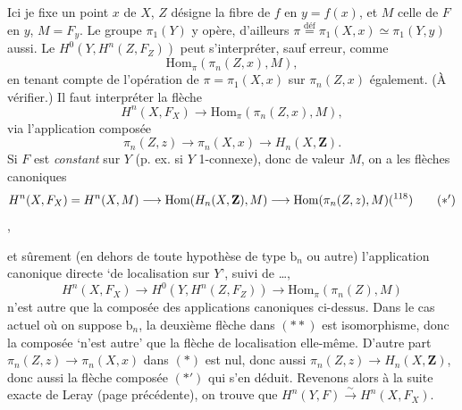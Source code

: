 \documentclass[11pt]{article}
\newcommand{\msp}[1]{\marginpar{\footnotesize [#1]}}
\begin{document}
Ici je fixe un point $x$ de $X$, $Z$ désigne la fibre de $f$ en $y=f(x)$, et $M$ celle de $F$ en $y$, $M=F_y$. Le groupe $\pi_1(Y)$ y opère, d’ailleurs $\pi \overset{\text{déf}}{=} \pi_1(X,x) \simeq \pi_1(Y,y)$ aussi. Le $H^0(Y,H^n(Z,F_Z))$ peut s’interpréter, sauf erreur, comme
\[
\mathrm{Hom}_\pi(\pi_n(Z,x),M),
\]
en tenant compte de l’opération de $\pi=\pi_1(X,x)$ sur $\pi_n(Z,x)$ également. (À vérifier.) Il faut interpréter la flèche
\[
H^n(X,F_X) \longrightarrow \mathrm{Hom}_\pi(\pi_n(Z,x),M),
\]
via l’application composée
\[
\pi_n(Z,z) \longrightarrow \pi_n(X,x) \longrightarrow H_n(X,\mathbf{Z}). \tag*{$(*)$}
\]
Si $F$ est \textit{constant} sur $Y$ (p. ex. si $Y$ 1-connexe), donc de valeur $M$, on a les flèches canoniques
\[
H^n(X,F_X) = H^n(X,M) \longrightarrow \mathrm{Hom}(H_n(X,\mathbf{Z}),M) \longrightarrow \mathrm{Hom}(\pi_n(Z,z),M)\text{(\footnotemark[118])} \tag*{$(*')$}
\]
,

\msp{page 182}
et sûrement (en dehors de toute hypothèse de type $\mathrm{b}_n$ ou autre) l’application canonique directe ‘de localisation sur $Y$’, suivi de \dots,
\[
H^n(X,F_X) \longrightarrow H^0(Y,H^n(Z,F_Z)) \longrightarrow \mathrm{Hom}_\pi(\pi_n(Z),M) \tag*{$(**)$}
\]
n’est autre que la composée des applications canoniques ci-dessus. Dans le cas actuel où on suppose $\mathrm{b}_n$, la deuxième flèche dans $(**)$ est isomorphisme, donc la composée ‘n’est autre’ que la flèche de localisation elle-même. D’autre part $\pi_n(Z,z) \longrightarrow \pi_n(X,x)$ dans $(*)$ est nul, donc aussi $\pi_n(Z,z) \longrightarrow H_n(X,\mathbf{Z})$, donc aussi la flèche composée $(*')$ qui s’en déduit. Revenons alors à la suite exacte de Leray (page précédente), on trouve que $H^n(Y,F) \xrightarrow{\ \sim\ } H^n(X,F_X)$.
\end{document}
